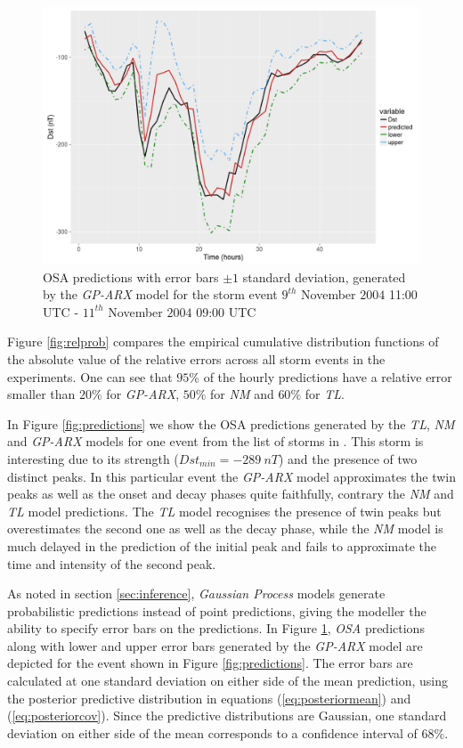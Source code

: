\documentclass[referee,a4paper,12pt,traditabstract]{swsc}
\begin{document}
\begin{linenumbers}
\begin{figure}
   \centering
   \includegraphics[width=\textwidth]{Compare_pred_err_bar.png}
      \caption{OSA predictions with error bars $\pm 1$ standard deviation, generated by the \emph{GP-ARX} model for the storm event $9^{th}$ November $2004$ 11:00 UTC - $11^{th}$ November $2004$ 09:00 UTC}
         \label{fig:predictionswitherrorbar}
\end{figure}

Figure \ref{fig:relprob} compares the empirical cumulative distribution functions of the absolute value of the relative errors across all storm events in the experiments.  One can see that $95\%$ of the hourly predictions have a relative error smaller than $20\%$ for \emph{GP-ARX}, $50\%$ for \emph{NM} and $60\%$ for \emph{TL}.

In Figure \ref{fig:predictions} we show the OSA predictions generated by the \emph{TL}, \emph{NM} and \emph{GP-ARX} models for one event from the list of storms in \citet{Ji2012}. This storm is interesting due to its strength ($Dst_{min} = -289 \ nT$) and the presence of two distinct peaks. In this particular event the \emph{GP-ARX} model approximates the twin peaks as well as the onset and decay phases quite faithfully, contrary the \emph{NM} and \emph{TL} model predictions. The \emph{TL} model recognises the presence of twin peaks but overestimates the second one as well as the decay phase, while the \emph{NM} model is much delayed in the prediction of the initial peak and fails to approximate the time and intensity of the second peak.

As noted in section \ref{sec:inference}, \emph{Gaussian Process} models generate probabilistic predictions instead of point predictions, giving the modeller the ability to specify error bars on the predictions. In Figure \ref{fig:predictionswitherrorbar}, \emph{OSA} predictions along with lower and upper error bars generated by the \emph{GP-ARX} model are depicted for the event shown in Figure \ref{fig:predictions}. The error bars are calculated at one standard deviation on either side of the mean prediction, using the posterior predictive distribution in equations (\ref{eq:posteriormean}) and (\ref{eq:posteriorcov}). Since the predictive distributions are Gaussian, one standard deviation on either side of the mean corresponds to a confidence interval of $68\%$.




\end{linenumbers}
\end{document}
